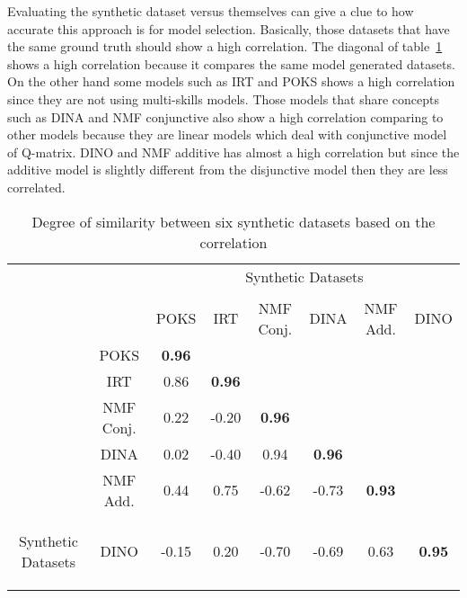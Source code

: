 Evaluating the synthetic dataset versus themselves can give a clue to how accurate this approach is for model selection. Basically, those datasets that have the same ground truth should show a high correlation. The diagonal of table~\ref{tablSyn} shows a high correlation because it compares the same model generated datasets. On the other hand some models such as IRT and POKS shows a high correlation since they are not using multi-skills models. Those models that share concepts such as DINA and NMF conjunctive also show a high correlation comparing to other models because they are linear models which deal with conjunctive model of Q-matrix. DINO and NMF additive has almost a high correlation but since the additive model is slightly different from the disjunctive model then they are less correlated.


\begin{table}[h]
\center
\begin{tabular}{c|c|c|c|c|c|c|c|}
\multicolumn{2}{c}{} & \multicolumn{6}{c}{Synthetic Datasets} \tabularnewline
\multicolumn{8}{c}{} \tabularnewline
\cline{3-8} 
\multicolumn{2}{c|}{} & POKS & IRT & NMF Conj. & DINA & NMF Add. & DINO\tabularnewline
\cline{2-8}
\cline{2-3}
&POKS & \textbf {0.96} & \multicolumn{1}{|c}{} & \multicolumn{1}{c}{} & \multicolumn{1}{c}{} & \multicolumn{1}{c}{}\tabularnewline
\cline{2-4}
&IRT & 0.86 & \textbf {0.96} & \multicolumn{1}{|c}{} & \multicolumn{1}{c}{} & \multicolumn{1}{c}{} & \multicolumn{1}{c}{}\tabularnewline
\cline{2-5}
&NMF Conj. & 0.22 & -0.20 & \textbf {0.96} & \multicolumn{1}{|c}{} & \multicolumn{1}{c}{} & \multicolumn{1}{c}{}\tabularnewline
\cline{2-6}
&DINA & 0.02 & -0.40 & 0.94 & \textbf {0.96} & \multicolumn{1}{|c}{} & \multicolumn{1}{c}{}\tabularnewline
\cline{2-7}
&NMF Add. & 0.44 & 0.75 & -0.62 & -0.73 & \textbf {0.93} & \multicolumn{1}{|c}{}\tabularnewline
\cline{2-8}
\multicolumn{1}{c|}{\multirow{-6}{*}{\begin{sideways}Synthetic Datasets\end{sideways}}}&DINO & -0.15 & 0.20 & -0.70 & -0.69 & 0.63 & \textbf {0.95}\tabularnewline
\cline{2-8}
\end{tabular}
\caption{Degree of similarity between six synthetic datasets based on the correlation}
\label{tablSyn}
\end{table}




